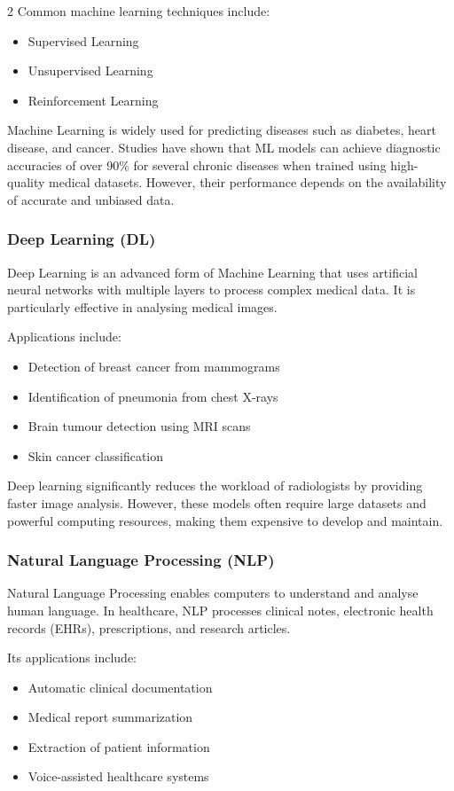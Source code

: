 \begin{multicols}{2}
  \noindent
  Common machine learning techniques include:
  \begin{itemize}
    \item Supervised Learning
    \item Unsupervised Learning
    \item Reinforcement Learning
  \end{itemize}

  Machine Learning is widely used for predicting diseases such as diabetes, heart disease, and cancer. Studies have shown that ML models can achieve diagnostic accuracies of over 90\% for several chronic diseases when trained using high-quality medical datasets. However, their performance depends on the availability of accurate and unbiased data.

  \subsubsection*{Deep Learning (DL)}
  Deep Learning is an advanced form of Machine Learning that uses artificial neural networks with multiple layers to process complex medical data. It is particularly effective in analysing medical images.

  \noindent
  Applications include:
  \begin{itemize}
    \item Detection of breast cancer from mammograms
    \item Identification of pneumonia from chest X-rays
    \item Brain tumour detection using MRI scans
    \item Skin cancer classification
  \end{itemize}

  Deep learning significantly reduces the workload of radiologists by providing faster image analysis. However, these models often require large datasets and powerful computing resources, making them expensive to develop and maintain.

  \subsubsection*{Natural Language Processing (NLP)}
  Natural Language Processing enables computers to understand and analyse human language. In healthcare, NLP processes clinical notes, electronic health records (EHRs), prescriptions, and research articles.

  \noindent
  Its applications include:
  \begin{itemize}
    \item Automatic clinical documentation
    \item Medical report summarization
    \item Extraction of patient information
    \item Voice-assisted healthcare systems
  \end{itemize}


\end{multicols}
